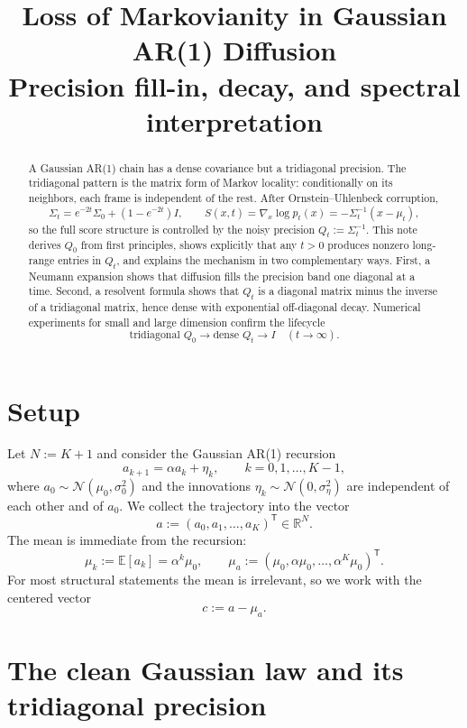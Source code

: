 \documentclass[11pt]{article}
\title{Loss of Markovianity in Gaussian AR(1) Diffusion\\[2mm]
\large Precision fill-in, decay, and spectral interpretation}
\author{}
\date{}
\newcommand{\R}{\mathbb{R}}
\newcommand{\E}{\mathbb{E}}
\newcommand{\Id}{I}
\newcommand{\trans}{\mathsf{T}}
\newcommand{\Ncal}{\mathcal{N}}
\begin{document}
\maketitle

\begin{abstract}
A Gaussian AR(1) chain has a dense covariance but a tridiagonal precision. The tridiagonal pattern is the matrix form of Markov locality: conditionally on its neighbors, each frame is independent of the rest. After Ornstein--Uhlenbeck corruption,
\[
\Sigma_t=e^{-2t}\Sigma_0+(1-e^{-2t})\Id,
\qquad
S(x,t)=\nabla_x \log p_t(x)=-\Sigma_t^{-1}(x-\mu_t),
\]
so the full score structure is controlled by the noisy precision $Q_t:=\Sigma_t^{-1}$. This note derives $Q_0$ from first principles, shows explicitly that any $t>0$ produces nonzero long-range entries in $Q_t$, and explains the mechanism in two complementary ways. First, a Neumann expansion shows that diffusion fills the precision band one diagonal at a time. Second, a resolvent formula shows that $Q_t$ is a diagonal matrix minus the inverse of a tridiagonal matrix, hence dense with exponential off-diagonal decay. Numerical experiments for small and large dimension confirm the lifecycle
\[
\text{tridiagonal }Q_0 \longrightarrow \text{dense }Q_t \longrightarrow \Id\quad (t\to\infty).
\]
\end{abstract}

\section{Setup}
Let $N:=K+1$ and consider the Gaussian AR(1) recursion
\begin{equation}\label{eq:ar1}
 a_{k+1}=\alpha a_k+\eta_k,
 \qquad k=0,1,\dots,K-1,
\end{equation}
where $a_0\sim\Ncal(\mu_0,\sigma_0^2)$ and the innovations $\eta_k\sim\Ncal(0,\sigma_\eta^2)$ are independent of each other and of $a_0$. We collect the trajectory into the vector
\[
 a:=(a_0,a_1,\dots,a_K)^\trans\in\R^N.
\]
The mean is immediate from the recursion:
\[
\mu_k:=\E[a_k]=\alpha^k\mu_0,
\qquad
\mu_a:=(\mu_0,\alpha\mu_0,\dots,\alpha^K\mu_0)^\trans.
\]
For most structural statements the mean is irrelevant, so we work with the centered vector
\[
 c:=a-\mu_a.
\]

\section{The clean Gaussian law and its tridiagonal precision}
\end{document}
